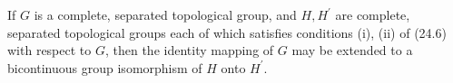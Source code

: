If $G$ is a complete, separated topological group, and $H, H^\prime$ are complete, separated topological groups each of which satisfies conditions (i), (ii) of (24.6) with respect to $G$, then the identity mapping of $G$ may be extended to a bicontinuous group isomorphism of $H$ onto $H^\prime$.